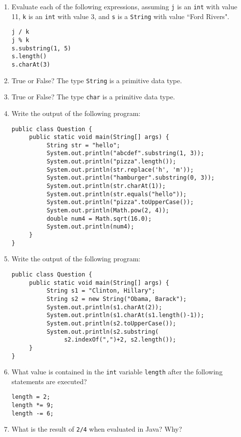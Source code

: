 \begin{enumerate}[label={\arabic{counter}\addtocounter{counter}{1}}.]
\item Evaluate each of the following expressions, assuming \verb|j| is an \verb|int| with value 11, \verb|k| is an \verb|int| with value 3, and \verb|s| is a \verb|String| with value ``Ford Rivers".
\begin{lstlisting}
j / k
j % k
s.substring(1, 5)
s.length()
s.charAt(3)
\end{lstlisting}

\item True or False? The type \verb|String| is a primitive data type.

\item True or False? The type \verb|char| is a primitive data type.

\item Write the output of the following program:
\begin{lstlisting}
public class Question {
     public static void main(String[] args) {
          String str = "hello";
          System.out.println("abcdef".substring(1, 3));
          System.out.println("pizza".length());
          System.out.println(str.replace('h', 'm'));
          System.out.println("hamburger".substring(0, 3));
          System.out.println(str.charAt(1));
          System.out.println(str.equals("hello"));
          System.out.println("pizza".toUpperCase());
          System.out.println(Math.pow(2, 4));
          double num4 = Math.sqrt(16.0);
          System.out.println(num4);
     }
}
\end{lstlisting}

\item Write the output of the following program:
\begin{lstlisting}
public class Question {
     public static void main(String[] args) {
          String s1 = "Clinton, Hillary";
          String s2 = new String("Obama, Barack");
          System.out.println(s1.charAt(2));
          System.out.println(s1.charAt(s1.length()-1));
          System.out.println(s2.toUpperCase());
          System.out.println(s2.substring(
               s2.indexOf(",")+2, s2.length());
     }
}
\end{lstlisting}

\item What value is contained in the \verb|int| variable \verb|length| after the following statements are executed?
\begin{lstlisting}
length = 2;
length *= 9;
length -= 6;
\end{lstlisting}

\item What is the result of \verb|2/4| when evaluated in Java? Why?

\end{enumerate}

